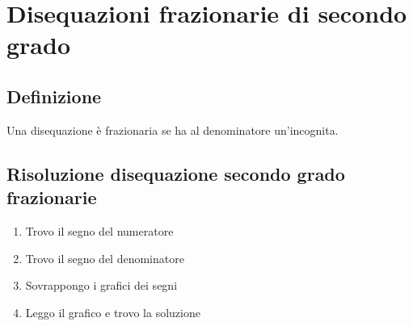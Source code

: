 \chapter{Disequazioni frazionarie di secondo grado}
\section{Definizione}
Una disequazione è frazionaria se ha al denominatore un'incognita.
\section{Risoluzione disequazione secondo grado frazionarie}
\begin{enumerate}
	\item Trovo il segno del numeratore
	\item Trovo il segno del denominatore
	\item Sovrappongo i grafici dei segni
	\item Leggo il grafico e trovo la soluzione
\end{enumerate}
